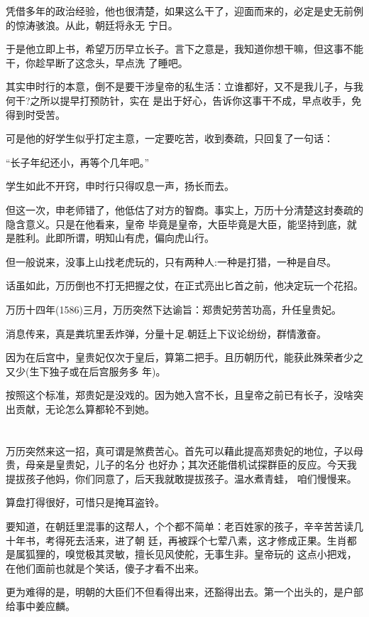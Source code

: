 \documentclass[11pt,a4paper,onecolumn]{article}
\begin{document}
凭借多年的政治经验，他也很清楚，如果这么干了，迎面而来的，必定是史无前例的惊涛骇浪。从此，朝廷将永无
宁日。

于是他立即上书，希望万历早立长子。言下之意是，我知道你想干嘛，但这事不能干，你趁早断了这念头，早点洗
了睡吧。

其实申时行的本意，倒不是要干涉皇帝的私生活：立谁都好，又不是我儿子，与我何干?之所以提早打预防针，实在
是出于好心，告诉你这事干不成，早点收手，免得到时受苦。

可是他的好学生似乎打定主意，一定要吃苦，收到奏疏，只回复了一句话：

``长子年纪还小，再等个几年吧。''

学生如此不开窍，申时行只得叹息一声，扬长而去。

但这一次，申老师错了，他低估了对方的智商。事实上，万历十分清楚这封奏疏的隐含意义。只是在他看来，皇帝
毕竟是皇帝，大臣毕竟是大臣，能坚持到底，就是胜利。此即所谓，明知山有虎，偏向虎山行。

但一般说来，没事上山找老虎玩的，只有两种人:一种是打猎，一种是自尽。

话虽如此，万历倒也不打无把握之仗，在正式亮出匕首之前，他决定玩一个花招。

万历十四年(1586)三月，万历突然下达谕旨：郑贵妃劳苦功高，升任皇贵妃。

消息传来，真是粪坑里丢炸弹，分量十足.朝廷上下议论纷纷，群情激奋。

因为在后宫中，皇贵妃仅次于皇后，算第二把手。且历朝历代，能获此殊荣者少之又少(生下独子或在后宫服务多
年)。

按照这个标准，郑贵妃是没戏的。因为她入宫不长，且皇帝之前已有长子，没啥突出贡献，无论怎么算都轮不到她。

\section[\thesection]{}

万历突然来这一招，真可谓是煞费苦心。首先可以藉此提高郑贵妃的地位，子以母贵，母亲是皇贵妃，儿子的名分
也好办；其次还能借机试探群臣的反应。今天我提拔孩子他妈，你们同意了，后天我就敢提拔孩子。温水煮青蛙，
咱们慢慢来。

算盘打得很好，可惜只是掩耳盗铃。

要知道，在朝廷里混事的这帮人，个个都不简单：老百姓家的孩子，辛辛苦苦读几十年书，考得死去活来，进了朝
廷，再被踩个七荤八素，这才修成正果。生肖都是属狐狸的，嗅觉极其灵敏，擅长见风使舵，无事生非。皇帝玩的
这点小把戏，在他们面前也就是个笑话，傻子才看不出来。

更为难得的是，明朝的大臣们不但看得出来，还豁得出去。第一个出头的，是户部给事中姜应麟。
\end{document}
